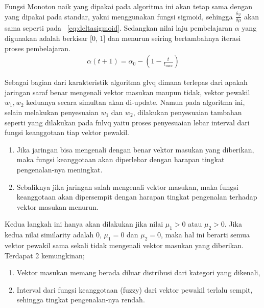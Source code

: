 Fungsi Monoton naik yang dipakai pada algoritma ini akan tetap sama dengan yang
dipakai pada \glvq standar, yakni menggunakan fungsi sigmoid, sehingga
$\frac{\delta \varphi}{\delta \mu}$ akan sama seperti pada
\equ~\ref{eq:deltasigmoid}. Sedangkan nilai laju pembelajaran $\alpha$ yang
digunakan adalah berkisar [0, 1] dan menurun seiring bertambahnya iterasi proses
pembelajaran. 
\begin{align}
\label{eq:alpha}
	\alpha(t+1) = \alpha_0 - (1 - \frac{t}{t_{max}})
\end{align}


Sebagai bagian dari karakteristik algoritma \gls{glvq} dimana terlepas dari
apakah jaringan saraf benar mengenali vektor masukan maupun tidak, vektor
pewakil $w_1, w_2$ keduanya secara simultan akan di-update. Namun pada algoritma
ini, selain melakukan penyesuaian $w_1$ dan $w_2$, dilakukan penyesuaian
tambahan seperti yang dilakukan pada \gls{fnlvq} yaitu proses penyesuaian
lebar interval dari fungsi keanggotaan tiap vektor pewakil. 
\begin{enumerate}
  \setlength{\itemsep}{1pt}
  \setlength{\parskip}{0pt}
  \setlength{\parsep}{0pt}
  \item Jika jaringan bisa mengenali dengan benar vektor masukan yang diberikan,
  maka fungsi keanggotaan akan diperlebar dengan harapan tingkat pengenalan-nya
  meningkat. 
  \item Sebaliknya jika jaringan salah mengenali vektor masukan, maka fungsi
  keanggotaan akan dipersempit dengan harapan tingkat pengenalan terhadap 
  vektor masukan menurun. 
\end{enumerate}

\noindent Kedua langkah ini hanya akan dilakukan jika nilai $\mu_1 > 0$ atau
$\mu_2 > 0$. Jika  kedua nilai similarity adalah 0, $\mu_1=0$ dan $\mu_2=0$, 
maka hal ini berarti semua vektor pewakil sama sekali tidak mengenali vektor 
masukan yang diberikan. Terdapat 2 kemungkinan; 
\begin{enumerate}
  \setlength{\itemsep}{1pt}
  \setlength{\parskip}{0pt}
  \setlength{\parsep}{0pt}
  \item Vektor masukan memang berada diluar distribusi dari kategori yang
  dikenali, 
  \item Interval dari fungsi keanggotaan (fuzzy) dari vektor pewakil
  terlalu sempit, sehingga tingkat pengenalan-nya rendah. 
\end{enumerate}

